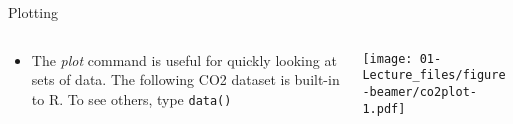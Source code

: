 \documentclass[
  ignorenonframetext,
  aspectratio=169]{beamer}
\newenvironment{Shaded}{\begin{snugshade}}{\end{snugshade}}
\newcommand{\AttributeTok}[1]{\textcolor[rgb]{0.13,0.29,0.53}{#1}}
\newcommand{\CommentTok}[1]{\textcolor[rgb]{0.56,0.35,0.01}{\textit{#1}}}
\newcommand{\DecValTok}[1]{\textcolor[rgb]{0.00,0.00,0.81}{#1}}
\newcommand{\FunctionTok}[1]{\textcolor[rgb]{0.13,0.29,0.53}{\textbf{#1}}}
\newcommand{\NormalTok}[1]{#1}
\newcommand{\SpecialCharTok}[1]{\textcolor[rgb]{0.81,0.36,0.00}{\textbf{#1}}}
\newcommand{\StringTok}[1]{\textcolor[rgb]{0.31,0.60,0.02}{#1}}
\providecommand{\tightlist}{%
  \setlength{\itemsep}{0pt}\setlength{\parskip}{0pt}}
\let\oldShaded\Shaded %
\let\endoldShaded\endShaded
\renewenvironment{Shaded}{\footnotesize\oldShaded}{\endoldShaded}
\begin{document}
\begin{frame}[fragile]{Plotting}
\protect\hypertarget{plotting}{}
\begin{columns}[T]
\begin{column}{0.48\textwidth}
\begin{itemize}[<+->]
\tightlist
\item
  The \emph{plot} command is useful for quickly looking at sets of data.
  The following CO2 dataset is built-in to R. To see others, type
  \texttt{data()}
\end{itemize}

\begin{Shaded}
\end{Shaded}
\end{column}

\begin{column}{0.48\textwidth}
\texttt{[image: 01-Lecture\_files/figure-beamer/co2plot-1.pdf]}
\end{column}
\end{columns}
\end{frame}
\end{document}

